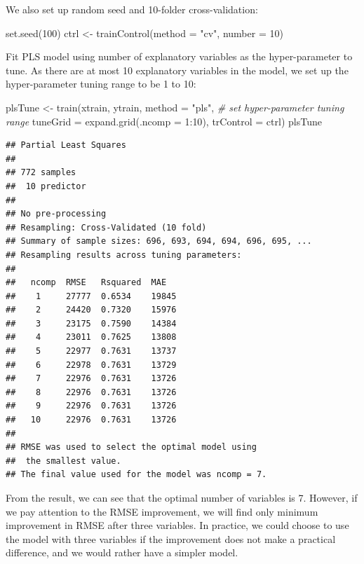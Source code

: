 \documentclass[
  12pt,
]{krantz}
\makeatletter
\newenvironment{Shaded}{\begin{snugshade}}{\end{snugshade}}
\newcommand{\AttributeTok}[1]{\textcolor[rgb]{0.61,0.61,0.61}{#1}}
\newcommand{\CommentTok}[1]{\textcolor[rgb]{0.37,0.37,0.37}{\textit{#1}}}
\newcommand{\DecValTok}[1]{\textcolor[rgb]{0.06,0.06,0.06}{#1}}
\newcommand{\FunctionTok}[1]{\textcolor[rgb]{0,0,0}{#1}}
\newcommand{\NormalTok}[1]{#1}
\newcommand{\OtherTok}[1]{\textcolor[rgb]{0.37,0.37,0.37}{#1}}
\newcommand{\SpecialCharTok}[1]{\textcolor[rgb]{0,0,0}{#1}}
\newcommand{\StringTok}[1]{\textcolor[rgb]{0.5,0.5,0.5}{#1}}
\newenvironment{kframe}{%
\medskip{}
\setlength{\fboxsep}{.8em}
 \def\at@end@of@kframe{}%
 \ifinner\ifhmode%
  \def\at@end@of@kframe{\end{minipage}}%
  \begin{minipage}{\columnwidth}%
 \fi\fi%
 \def\FrameCommand##1{\hskip\@totalleftmargin \hskip-\fboxsep
 \colorbox{shadecolor}{##1}\hskip-\fboxsep
     \hskip-\linewidth \hskip-\@totalleftmargin \hskip\columnwidth}%
 \MakeFramed {\advance\hsize-\width
   \@totalleftmargin\z@ \linewidth\hsize
   \@setminipage}}%
 {\par\unskip\endMakeFramed%
 \at@end@of@kframe}
\renewenvironment{Shaded}{\begin{kframe}}{\end{kframe}}
\makeatother
\begin{document}
We also set up random seed and 10-folder cross-validation:

\begin{Shaded}
\begin{Highlighting}[]
\FunctionTok{set.seed}\NormalTok{(}\DecValTok{100}\NormalTok{)}
\NormalTok{ctrl }\OtherTok{\textless{}{-}} \FunctionTok{trainControl}\NormalTok{(}\AttributeTok{method =} \StringTok{"cv"}\NormalTok{, }\AttributeTok{number =} \DecValTok{10}\NormalTok{)}
\end{Highlighting}
\end{Shaded}

Fit PLS model using number of explanatory variables as the hyper-parameter to tune. As there are at most 10 explanatory variables in the model, we set up the hyper-parameter tuning range to be 1 to 10:

\begin{Shaded}
\begin{Highlighting}[]
\NormalTok{plsTune }\OtherTok{\textless{}{-}} \FunctionTok{train}\NormalTok{(xtrain, ytrain, }
                 \AttributeTok{method =} \StringTok{"pls"}\NormalTok{, }
                 \CommentTok{\# set hyper{-}parameter tuning range}
                 \AttributeTok{tuneGrid =} \FunctionTok{expand.grid}\NormalTok{(}\AttributeTok{.ncomp =} \DecValTok{1}\SpecialCharTok{:}\DecValTok{10}\NormalTok{),}
                 \AttributeTok{trControl =}\NormalTok{ ctrl)}
\NormalTok{plsTune}
\end{Highlighting}
\end{Shaded}

\begin{verbatim}
## Partial Least Squares 
## 
## 772 samples
##  10 predictor
## 
## No pre-processing
## Resampling: Cross-Validated (10 fold) 
## Summary of sample sizes: 696, 693, 694, 694, 696, 695, ... 
## Resampling results across tuning parameters:
## 
##   ncomp  RMSE   Rsquared  MAE  
##    1     27777  0.6534    19845
##    2     24420  0.7320    15976
##    3     23175  0.7590    14384
##    4     23011  0.7625    13808
##    5     22977  0.7631    13737
##    6     22978  0.7631    13729
##    7     22976  0.7631    13726
##    8     22976  0.7631    13726
##    9     22976  0.7631    13726
##   10     22976  0.7631    13726
## 
## RMSE was used to select the optimal model using
##  the smallest value.
## The final value used for the model was ncomp = 7.
\end{verbatim}

From the result, we can see that the optimal number of variables is 7. However, if we pay attention to the RMSE improvement, we will find only minimum improvement in RMSE after three variables. In practice, we could choose to use the model with three variables if the improvement does not make a practical difference, and we would rather have a simpler model. 
\end{document}
